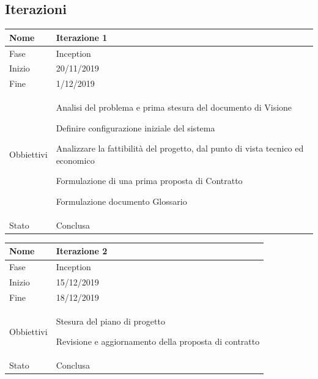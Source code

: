 \subsection{Iterazioni}

\begin{center}

\begin{tabular}{ |p{2cm}|p{10cm}|  }
\hline
Nome & Iterazione 1 \\\hline
Fase & Inception \\\hline
Inizio & 20/11/2019 \\\hline
Fine &  1/12/2019 \\\hline
Obbiettivi & 
	\begin{compactitem}
		\item Analisi del problema e prima stesura del documento di Visione
		\item Definire configurazione iniziale del sistema
		\item Analizzare la fattibilità del progetto, dal punto di vista tecnico ed economico
		\item Formulazione di una prima proposta di Contratto
		\item Formulazione documento Glossario
	\end{compactitem}\\\hline
Stato &  Conclusa \\\hline
\end{tabular}
\label{table:1}\newline

\begin{tabular}{ |p{2cm}|p{10cm}|  }
\hline
Nome & Iterazione 2 \\\hline
Fase & Inception \\\hline
Inizio & 15/12/2019 \\\hline
Fine &  18/12/2019 \\\hline
Obbiettivi & 
	\begin{compactitem}
		\item Stesura del piano di progetto
		\item Revisione e aggiornamento della proposta di contratto
	\end{compactitem}\\\hline
Stato &  Conclusa \\\hline
\end{tabular}
\label{table:2}\newline


\end{center}
